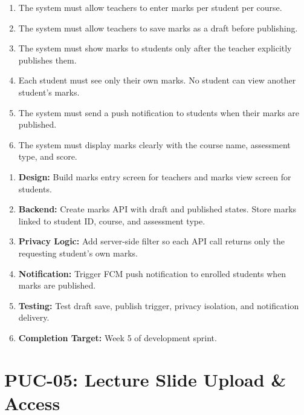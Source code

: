 \documentclass[12pt,a4paper]{article}
\begin{document}
\begin{tcolorbox}[frbox, title={Functional Requirements --- PUC-04}]
\begin{enumerate}[leftmargin=*, label=\textbf{FR-04.\arabic*}, itemsep=5pt]
  \item The system must allow teachers to enter marks per student per course.
  \item The system must allow teachers to save marks as a draft before publishing.
  \item The system must show marks to students only after the teacher explicitly publishes them.
  \item Each student must see only their own marks. No student can view another student's marks.
  \item The system must send a push notification to students when their marks are published.
  \item The system must display marks clearly with the course name, assessment type, and score.
\end{enumerate}
\end{tcolorbox}

\begin{tcolorbox}[planbox, title={Completion Plan --- PUC-04}]
\begin{enumerate}[leftmargin=*, label=\textbf{Step \arabic*:}, itemsep=4pt]
  \item \textbf{Design:} Build marks entry screen for teachers and marks view screen for students.
  \item \textbf{Backend:} Create marks API with draft and published states. Store marks linked to student ID, course, and assessment type.
  \item \textbf{Privacy Logic:} Add server-side filter so each API call returns only the requesting student's own marks.
  \item \textbf{Notification:} Trigger FCM push notification to enrolled students when marks are published.
  \item \textbf{Testing:} Test draft save, publish trigger, privacy isolation, and notification delivery.
  \item \textbf{Completion Target:} Week 5 of development sprint.
\end{enumerate}
\end{tcolorbox}
\newpage
\section{PUC-05: Lecture Slide Upload \& Access}
\end{document}

